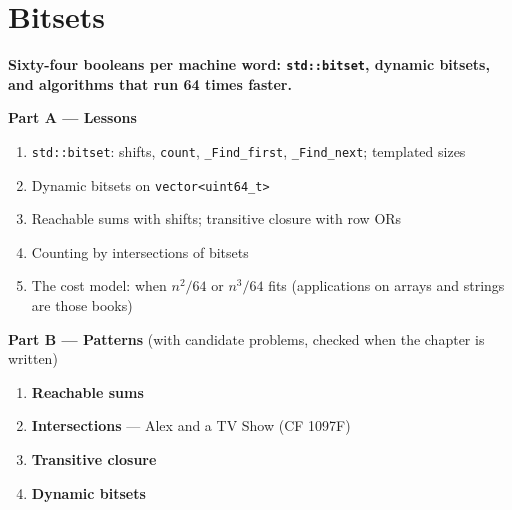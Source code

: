\chapter{Bitsets}
\label{ch:bitsets}

\begin{tcolorbox}[enhanced, colback=white, colframe=secondaryblue, boxrule=1pt, arc=2mm]
\textbf{\large\textcolor{primaryblue}{Sixty-four booleans per machine word: \texttt{std::bitset}, dynamic bitsets, and algorithms that run 64 times faster.}}
\end{tcolorbox}


\begin{plannedbox}
\textbf{Part A --- Lessons}
\begin{enumerate}[leftmargin=*, label=\textbf{A\arabic*.}, itemsep=1pt]
    \item \texttt{std::bitset}: shifts, \texttt{count}, \texttt{\_Find\_first}, \texttt{\_Find\_next}; templated sizes
    \item Dynamic bitsets on \texttt{vector<uint64\_t>}
    \item Reachable sums with shifts; transitive closure with row ORs
    \item Counting by intersections of bitsets
    \item The cost model: when $n^2/64$ or $n^3/64$ fits (applications on arrays and strings are those books)
\end{enumerate}
\textbf{Part B --- Patterns} (with candidate problems, checked when the chapter is written)
\begin{enumerate}[leftmargin=*, label=\textbf{P\arabic*.}, itemsep=1pt]
    \item \textbf{Reachable sums}
    \item \textbf{Intersections} --- Alex and a TV Show {\small\color{darkgray}(CF 1097F)}
    \item \textbf{Transitive closure}
    \item \textbf{Dynamic bitsets}
\end{enumerate}
\end{plannedbox}
